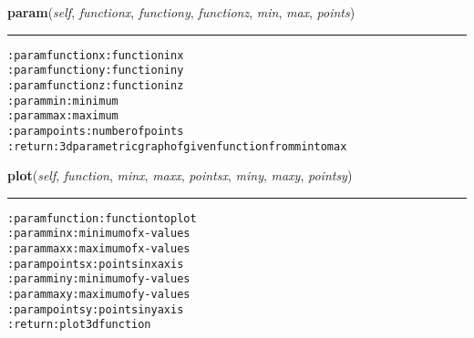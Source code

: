     \label{hal:maths:plotter:Plot3d:param}

    \vspace{0.5ex}

\hspace{.8\funcindent}\begin{boxedminipage}{\funcwidth}

    \raggedright \textbf{param}(\textit{self}, \textit{functionx}, \textit{functiony}, \textit{functionz}, \textit{min}, \textit{max}, \textit{points})

    \vspace{-1.5ex}

    \rule{\textwidth}{0.5\fboxrule}
\setlength{\parskip}{2ex}
\begin{alltt}

:param functionx: function in x
:param functiony: function in y
:param functionz: function in z
:param min: minimum
:param max: maximum
:param points: number of points
:return: 3d parametric graph of given function from min to max
\end{alltt}

\setlength{\parskip}{1ex}
    \end{boxedminipage}

    \label{hal:maths:plotter:Plot3d:plot}

    \vspace{0.5ex}

\hspace{.8\funcindent}\begin{boxedminipage}{\funcwidth}

    \raggedright \textbf{plot}(\textit{self}, \textit{function}, \textit{minx}, \textit{maxx}, \textit{pointsx}, \textit{miny}, \textit{maxy}, \textit{pointsy})

    \vspace{-1.5ex}

    \rule{\textwidth}{0.5\fboxrule}
\setlength{\parskip}{2ex}
\begin{alltt}

:param function: function to plot
:param minx: minimum of x-values
:param maxx: maximum of x-values
:param pointsx: points in x axis
:param miny: minimum of y-values
:param maxy: maximum of y-values
:param pointsy: points in y axis
:return: plot 3d function
\end{alltt}

\setlength{\parskip}{1ex}
    \end{boxedminipage}


